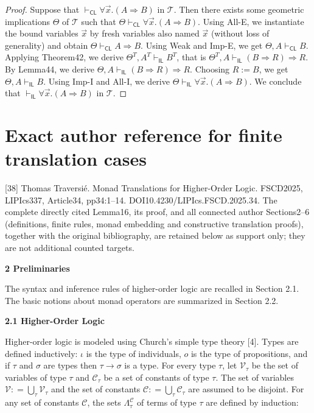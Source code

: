 \documentclass[10pt,a4paper]{article}
\newcommand{\IL}{\mathsf{IL}}
\newcommand{\CL}{\mathsf{CL}}
\begin{document}
\begin{proof}
Suppose that $\vdash_\CL\forall\vec x.(A\Rightarrow B)$ in $\mathcal T$. Then there exists some geometric implications $\Theta$ of $\mathcal T$ such that $\Theta\vdash_\CL\forall\vec x.(A\Rightarrow B)$. Using All-E, we instantiate the bound variables $\vec x$ by fresh variables also named $\vec x$ (without loss of generality) and obtain $\Theta\vdash_\CL A\Rightarrow B$. Using Weak and Imp-E, we get $\Theta,A\vdash_\CL B$. Applying Theorem42, we derive $\Theta^T,A^T\vdash_\IL B^T$, that is $\Theta^T,A\vdash_\IL(B\Rightarrow R)\Rightarrow R$. By Lemma44, we derive $\Theta,A\vdash_\IL(B\Rightarrow R)\Rightarrow R$. Choosing $R:=B$, we get $\Theta,A\vdash_\IL B$. Using Imp-I and All-I, we derive $\Theta\vdash_\IL\forall\vec x.(A\Rightarrow B)$. We conclude that $\vdash_\IL\forall\vec x.(A\Rightarrow B)$ in $\mathcal T$.
\end{proof}
\section*{Exact author reference for finite translation cases}
[38] Thomas Traversi\'e. Monad Translations for Higher-Order Logic. FSCD2025, LIPIcs337, Article34, pp34:1--14. DOI10.4230/LIPIcs.FSCD.2025.34. The complete directly cited Lemma16, its proof, and all connected author Sections2--6 (definitions, finite rules, monad embedding and constructive translation proofs), together with the original bibliography, are retained below as support only; they are not additional counted targets.


 
\par\medskip\noindent\textbf{2 Preliminaries}\par
 
 
The syntax and inference rules of higher-order logic are recalled in Section 2.1. The basic notions about monad operators are summarized in Section 2.2.\par
 
 
 
\par\medskip\noindent\textbf{2.1 Higher-Order Logic}\par
 
 
Higher-order logic is modeled using Church’s simple type theory [4]. Types are defined inductively: $\iota$ is the type of individuals, $o$ is the type of propositions, and if $\tau$ and $\sigma$ are types then $\tau\rightarrow\sigma$ is a type. For every type $\tau$, let $\mathcal{V}_{\tau}$ be the set of variables of type $\tau$ and $\mathcal{C}_{\tau}$ be a set of constants of type $\tau$. The set of variables $\mathcal{V}\mathrel{\mathop{:}}=\bigcup_{\tau}\mathcal{V}_{\tau}$ and the set of constants $\mathcal{C}\mathrel{\mathop{:}}=\bigcup_{\tau}\mathcal{C}_{\tau}$ are assumed to be disjoint. For any set of constants $\mathcal{C}$, the sets $\Lambda^{\mathcal{C}}_{\tau}$ of terms of type $\tau$ are defined by induction:\par
  
\end{document}
